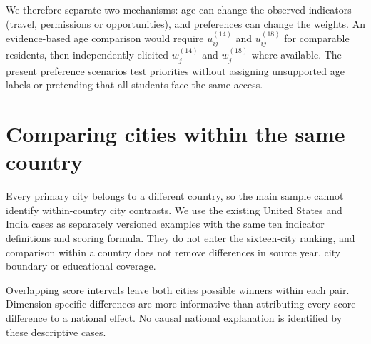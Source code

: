\AgeCase
We therefore separate two mechanisms: age can change the observed indicators
(travel, permissions or opportunities), and preferences can change the weights.
An evidence-based age comparison would require $u_{ij}^{(14)}$ and
$u_{ij}^{(18)}$ for comparable residents, then independently elicited
$w_j^{(14)}$ and $w_j^{(18)}$ where available. The present preference scenarios
test priorities without assigning unsupported age labels or pretending that
all students face the same access.

\section{Comparing cities within the same country}
Every primary city belongs to a different country, so the main sample cannot
identify within-country city contrasts. We use the existing United States and
India cases as separately versioned examples with the same ten indicator
definitions and scoring formula. They do not enter the sixteen-city ranking,
and comparison within a country does not remove differences in source year,
city boundary or educational coverage.



\CountryInterpretation
Overlapping score intervals leave both cities possible winners within each
pair. Dimension-specific differences are more informative than attributing
every score difference to a national effect. No causal national explanation is
identified by these descriptive cases.
